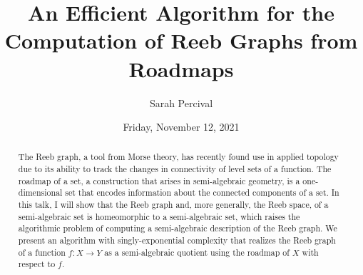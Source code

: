 \documentclass{UAmathtalk}
\author{Sarah Percival}
\title{An Efficient Algorithm for the Computation of Reeb Graphs from Roadmaps}
\date{Friday, November 12, 2021}
\begin{document}
\maketitle


\begin{abstract}
The Reeb graph, a tool from Morse theory, has recently found use in applied topology due to its ability to track the changes in connectivity of level sets of a function. The roadmap of a set, a construction that arises in semi-algebraic geometry, is a one-dimensional set that encodes information about the connected components of a set. In this talk, I will show that the Reeb graph and, more generally, the Reeb space, of a semi-algebraic set is homeomorphic to a semi-algebraic set, which raises the algorithmic problem of computing a semi-algebraic description of the Reeb graph. We present an algorithm with singly-exponential complexity that realizes the Reeb graph of a function $f:X \to Y$ as a semi-algebraic quotient using the roadmap of $X$ with respect to $f$.
\end{abstract}
\end{document}

